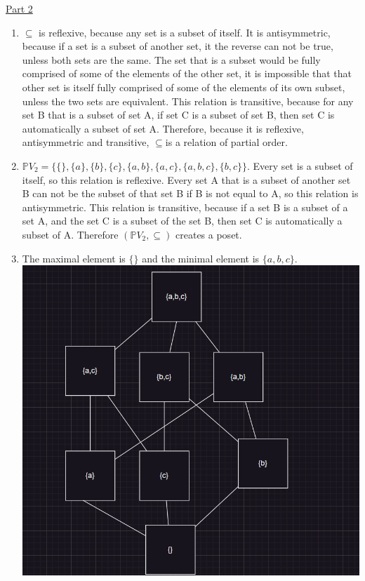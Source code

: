 \documentclass[12pt]{article}
\begin{document}
\noindent\underline{Part 2}\\
\begin{enumerate}
\item $\subseteq$ is reflexive, because any set is a subset of itself. It is antisymmetric, because if a set is a subset of another set, it the reverse can not be true, unless both sets are the same. The set that is a subset would be fully comprised of some of the elements of the other set, it is impossible that that other set is itself fully comprised of some of the elements of its own subset, unless the two sets are equivalent. This relation is transitive, because for any set B that is a subset of set A, if set C is a subset of set B, then set C is automatically a subset of set A. Therefore, because it is reflexive, antisymmetric and transitive, $\subseteq$is a relation of partial order.
\item $\mathbb{P}V_{2}= \{\{\},\{a\},\{b\},\{c\},\{a,b\},\{a,c\},\{a,b,c\},\{b,c\}\}$. Every set is a subset of itself, so this relation is reflexive. Every set A that is a subset of another set B can not be the subset of that set B if B is not equal to A, so this relation is antisymmetric. This relation is transitive, because if a set B is a subset of a set A, and the set C is a subset of the set B, then set C is automatically a subset of A. Therefore $(\mathbb{P}V_{2}, \subseteq)$ creates a poset.
\item The maximal element is $\{\}$ and the minimal element is $\{a,b,c\}$.\\
\includegraphics{P6P2Q3.png}\\
\end{enumerate}
\end{document}
